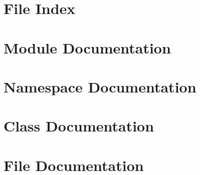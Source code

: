 \documentclass[twoside]{book}
\newcommand{\+}{\discretionary{\mbox{\scriptsize$\hookleftarrow$}}{}{}}
\newcommand{\clearemptydoublepage}{%
  \newpage{\pagestyle{empty}\cleardoublepage}%
}
\begin{document}
\chapter{File Index}

\chapter{Module Documentation}



\chapter{Namespace Documentation}



\chapter{Class Documentation}












\chapter{File Documentation}










































\backmatter
\newpage
{}
\clearemptydoublepage
{}
\printindex
\end{document}

